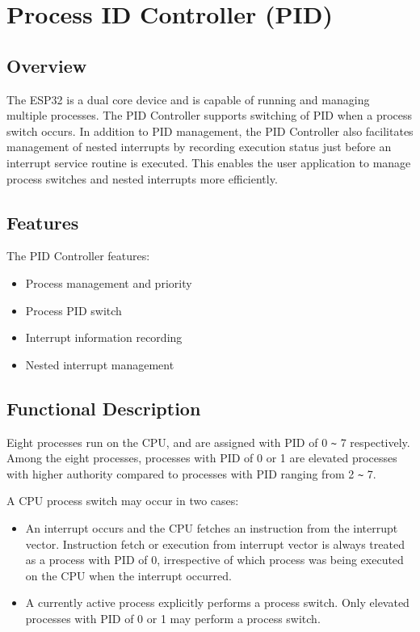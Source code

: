 \documentclass[main\_\_EN.tex]{subfiles}
\begin{document}
\hypertarget{pidctrl}{}
\chapter{Process ID Controller (PID)}
\label{mod:pid}

\section{Overview}

The ESP32 is a dual core device and is capable of running and managing multiple processes. The PID Controller supports switching of PID when a process switch occurs. In addition to PID management, the PID Controller also facilitates management of nested interrupts by recording execution status just before an interrupt service routine is executed. This enables the user application to manage process switches and nested interrupts more efficiently.

\section{Features}

The PID Controller features:
\begin{itemize}
    \item Process management and priority
    \item Process PID switch
    \item Interrupt information recording
    \item Nested interrupt management
\end{itemize}


\section{Functional Description}

Eight processes run on the CPU, and are assigned with PID of 0 \verb+~+ 7 respectively.
Among the eight processes, processes with PID of 0 or 1 are elevated processes with higher authority compared to processes with PID ranging from 2 \verb+~+ 7.

A CPU process switch may occur in two cases:
\begin{itemize}
    \item An interrupt occurs and the CPU fetches an instruction from the interrupt vector. Instruction fetch or execution from interrupt vector is always treated as a process with PID of 0, irrespective of which process was being executed on the CPU when the interrupt occurred.
    \item A currently active process explicitly performs a process switch. Only elevated processes with PID of 0 or 1 may perform a process switch.
\end{itemize}
\end{document}
